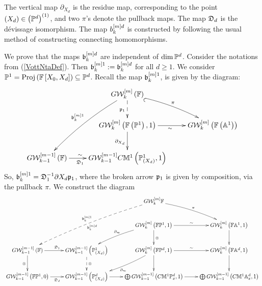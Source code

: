\documentclass[12pt]{article}
\begin{document}
The vertical map $\partial_{X_d}$ is the residue map, corresponding to the point $(X_d)\in \left( {\mathbb{P}}^d\right)^{\left( 1\right)}$, and 
two $\pi$'s denote the pullback maps. The map $\mathfrak {D}_d$ is the d\'{e}vissage isomorphism. 
The map $ b_k^{\left[ m\right]d}$ is constructed by following the usual method of constructing connecting homomorphisms. 
 
We prove that the maps $\mathfrak {b}^{\left[ m\right]d}_k$ are independent of $\dim {\mathbb{P}}^d$. 
\bL\label{Agreebott}{\rm 
Consider the notations from (\ref{VottNtaDef}). %
%
 Then
$\mathfrak {b}^{\left[ m\right]1}_k:=\mathfrak {b}^{\left[ m\right]d}_k$ for all $d\geq 1$. %
}
\eL
\pf%
We consider ${\mathbb{P}}^1=\mathrm{Proj}\left({\mathbb{F}}\left[ X_0, X_d\right]\right)\subseteq {\mathbb{P}}^d$. Recall the map $\mathfrak {b}^{\left[ m\right]1}_k$,
is given by the diagram:
$$
\diagram
&G{\CW}^{\LRt{m}}_k\LRf{{\BF}}\ar@/^/@{_(->}[dr]^{\pi}\ar@{-->}[d]_{\p_1}\ar@/_/[ddl]_{\b^{\LRt{m}1}_k}&\\
&G{\CW}^{\LRt{m}}_k\LRf{{\BF}\LRf{{\BP}^1}, 1} \ar[r]_{\sim} \ar[d]_{\partial_{X_d}} & 
G{\CW}^{\LRt{m}}_k\LRf{{\BF}\LRf{{\BA}^1}}\\
G{\CW}^{\LRt{m-1}}_{k-1}\LRf{{\BF}}\ar[r]_{\D_1\qquad}^{\sim\qquad}&
G{\CW}^{\LRt{m-1}}_{k-1}C{\BM}^1\LRf{{\BP}^1_{\LRf{X_d}}, 1}
& \\
\enddiagram 
$$ 
So, $\mathfrak {b}^{\left[ m\right]1}_k= \mathfrak {D}_1^{-1}\partial{X_d}\mathfrak {p}_1$, where the broken arrow $\mathfrak {p}_1$ is given by composition, via 
the pullback $\pi$.
%
We 
construct the diagram 
$$
\diagram 
&&G{\CW}_k^{\LRt{m}}{\BF} \ar@/^/[rd]^{\pi} \ar@/_/@{-->}[ddll]_{\b^{\LRt{m}1}_k}^{\b^{\LRt{m}d}_k}& \\
&&G{\CW}_k^{\LRt{m}}\LRf{{\BF}{\BP}^1, 1}\ar@/_/[dl]_{\partial_{\infty}}\ar[r]^{\sim}\ar[d]^{\otimes}&G{\CW}_k^{\LRt{m}}\LRf{{\BF}{\BA}^1, 1}\ar[d]\\
 G{\CW}_{k-1}^{\LRt{m-1}}\LRf{{\BF}} \ar[d]_{\otimes}\ar[r]^{\D_1} 
 &G{\CW}_{k-1}^{\LRt{m-1}}\LRf{{\BP}^1_{\LRf{X_d}}}\ar@{-->}[d]^{\otimes}
& G{\CW}_k^{\LRt{m}}\LRf{{\BF}{\BP}^d, 1} 
\ar@/^/[dl]^{\partial_{\infty}}\ar[r]^{\sim} \ar[d] & G{\CW}_k^{\LRt{m}}\LRf{{\BF}{\BA}^d, 1}\ar[d]\\
G{\CW}_{k-1}^{\LRt{m-1}}\LRf{{\BF}{\BP}^1, 0}\ar[r]_{\D_d}&G{\CW}_{k-1}^{\LRt{m-1}}\LRf{{\BP}^d_{\LRf{X_d}}}\ar[r] &\bigoplus G{\CW}_{k-1}^{\LRt{m-1}}\LRf{C{\BM}^1{\BP}^d_x, 1} \ar[r]&
\bigoplus G{\CW}_{k-1}^{\LRt{m-1}}\LRf{C{\BM}^1{\BA}^d_x, 1} \\
\enddiagram
$$
\end{document}
